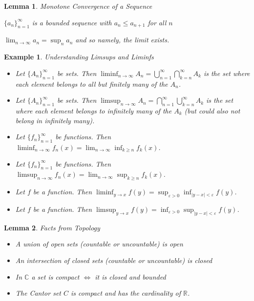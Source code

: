 \documentclass[12pt]{Qual}
\newtheorem{example}{Example}
\newtheorem{lemma}{Lemma}
\begin{document}
\vspace{0.5cm}
\begin{lemma}{\Large\textit{Monotone Convergence of a Sequence}}

$\{a_n\}_{n=1}^\infty$ is a bounded sequence with $a_n\le a_{n+1}$ for all $n$

 $\displaystyle\lim_{n\to\infty}a_n=\sup_na_n$ and so namely, the limit exists.

\end{lemma}
\vspace{0.5cm}
\begin{example}{\Large\textit{Understanding Limsups and Liminfs}}

\begin{itemize}
\renewcommand\labelitemi{\faBug}
    \item Let $\{A_n\}_{n=1}^\infty$ be sets. Then $\displaystyle\liminf_{n\to\infty}A_n=\bigcup_{n=1}^\infty\bigcap_{k=n}^\infty A_k$ is the set where each element belongs to all but finitely many of the $A_n$.
    \item  Let $\{A_n\}_{n=1}^\infty$ be sets. Then $\displaystyle\limsup_{n\to\infty}A_n=\bigcap_{n=1}^\infty\bigcup_{k=n}^\infty A_k$ is the set where each element belongs to infinitely many of the $A_k$ (but could also not belong in infinitely many).
    \item Let $\{f_n\}_{n=1}^\infty$ be functions. Then $\displaystyle\liminf_{n\to\infty}f_n(x)=\lim_{n\to\infty}\inf_{k\ge n}f_k(x)$.
    \item Let $\{f_n\}_{n=1}^\infty$ be functions. Then $\displaystyle\limsup_{n\to\infty}f_n(x)=\lim_{n\to\infty}\sup_{k\ge n}f_k(x)$.
    \item Let $f$ be a function. Then $\displaystyle\liminf_{y\to x}f(y)=\sup_{\varepsilon>0}\inf_{|y-x|<\varepsilon}f(y)$.
    \item Let $f$ be a function. Then $\displaystyle\limsup_{y\to x}f(y)=\inf_{\varepsilon>0}\sup_{|y-x|<\varepsilon}f(y)$.
\end{itemize}
\end{example}
\vspace{0.5cm}
\begin{lemma}{\Large\textit{Facts from Topology}}

\begin{itemize}
\renewcommand\labelitemi{\faCoffee}
    \item A union of open sets (countable or uncountable) is open
    \item An intersection of closed sets (countable or uncountable) is closed
    \item In $\mathbb{C}$ a set is compact $\iff$ it is closed and bounded
    \item The Cantor set $C$ is compact and has the cardinality of $\mathbb{R}$.
\end{itemize}

\end{lemma}
\end{document}
